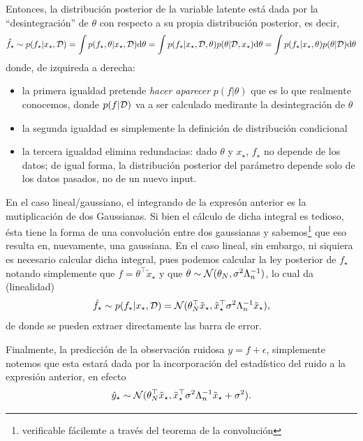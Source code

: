 Entonces, la distribución posterior de la variable latente  está dada por la ``desintegración'' de $\theta$  con respecto a su propia distribución posterior, es decir,
\begin{equation}
	\hat f_\star \sim p(f_\star|x_\star,{\mathcal D}) = \int p(f_\star, \theta|x_\star,{\mathcal D}){\text d}\theta = \int p(f_\star|x_\star, {\mathcal D}, \theta)p( \theta|{\mathcal D},x_\star){\text d}\theta= \int p(f_\star|x_\star, \theta)p( \theta|{\mathcal D}){\text d}\theta
\end{equation}
donde, de izquireda a derecha: 
\begin{itemize}
	\item la primera igualdad pretende \emph{hacer aparecer} $p(f|\theta)$ que es lo que realmente conocemos, donde $p(f|{\mathcal D})$ va a ser calculado medirante la desintegración de $\theta$
	\item la segunda igualdad es simplemente la definición de distribución condicional
	\item la tercera igualdad elimina redundacias: dado $\theta$ y $x_\star$, $f_\star$ no depende de los datos; de igual forma, la distribución posterior del parámetro depende solo de los datos pasados, no de un nuevo input.
\end{itemize}
En el caso lineal/gaussiano, el integrando de la expresón anterior es la mutiplicación de dos Gaussianas. Si bien el cálculo de dicha integral es tedioso, ésta tiene la forma de una convolución entre dos gaussianas y sabemos\footnote{verificable fácilemte a través del teorema de la convolución} que eso resulta en, nuevamente, una gaussiana. En el caso lineal, sin embargo, ni siquiera es necesario calcular dicha integral, pues podemos calcular la ley posterior de $f_\star$ notando simplemente que $f = \theta^\top \tilde{x}_\star$ y que $\theta \sim {\mathcal N}(\theta_N,\sigma^2\Lambda_n^{-1})$, lo cual da (linealidad)
\begin{equation}
	\hat f_\star \sim p(f_\star|x_\star,{\mathcal D}) = {\mathcal N}(\theta_N^\top \tilde{x}_\star,\tilde{x}_\star^\top\sigma^2\Lambda_n^{-1} \tilde{x}_\star),\label{eq:post_pref_f}
\end{equation}
de donde se pueden extraer directamente las barra de error. 

Finalmente, la predicción de la observación ruidosa $y=f+\epsilon$, simplemente notemos que esta estará dada por la incorporación del estadístico del ruido a la expresión anterior, en efecto
\begin{equation}
	\hat y_\star\sim{\mathcal N}(\theta_N^\top \tilde{x}_\star,\tilde{x}_\star^\top\sigma^2\Lambda_n^{-1} \tilde{x}_\star + \sigma^2).
\end{equation}


